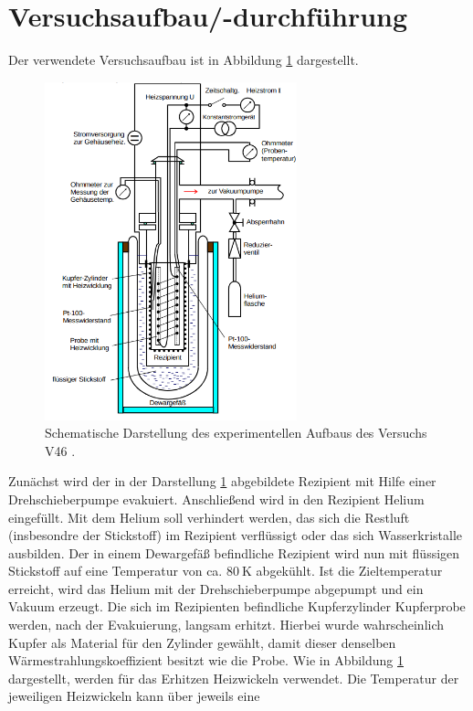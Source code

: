 \section{Versuchsaufbau/-durchführung}
Der verwendete Versuchsaufbau ist in Abbildung \ref{fig: aufbau} dargestellt.
\begin{figure}
  \centering
  \includegraphics[width = 0.65\textwidth]{./content/images/aufbau.png}
  \caption{Schematische Darstellung des experimentellen Aufbaus des Versuchs V46  \cite{anleitungV47}.}
  \label{fig: aufbau}
\end{figure}
Zunächst wird der in der Darstellung \ref{fig: aufbau} abgebildete Rezipient
mit Hilfe einer Drehschieberpumpe evakuiert. Anschließend wird in den Rezipient
Helium eingefüllt. Mit dem Helium soll verhindert werden, das sich die Restluft
(insbesondre der Stickstoff) im Rezipient verflüssigt oder das sich Wasserkristalle
ausbilden. Der in einem Dewargefäß befindliche Rezipient wird nun mit flüssigen
Stickstoff auf eine Temperatur von ca. $\SI{80}{\kelvin}$ abgekühlt. Ist die
Zieltemperatur erreicht, wird das Helium mit der Drehschieberpumpe abgepumpt und
ein Vakuum erzeugt. Die sich im Rezipienten befindliche Kupferzylinder
Kupferprobe werden, nach der Evakuierung, langsam erhitzt. Hierbei wurde wahrscheinlich Kupfer als Material
für den Zylinder gewählt, damit dieser denselben Wärmestrahlungskoeffizient besitzt
wie die Probe. Wie in Abbildung \ref{fig: aufbau} dargestellt, werden für das Erhitzen
Heizwickeln verwendet. Die Temperatur der jeweiligen Heizwickeln kann über jeweils eine
